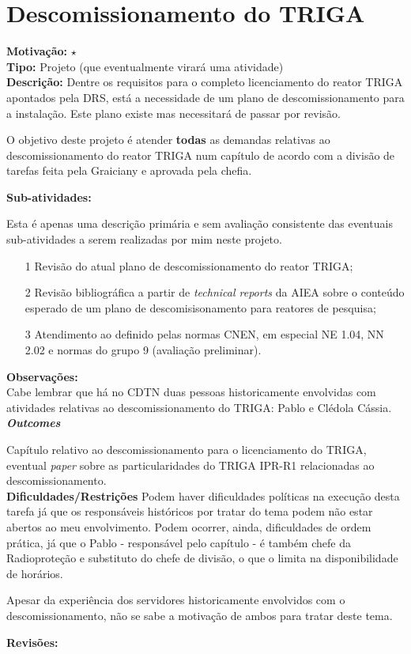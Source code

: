\chapter{Descomissionamento do TRIGA}

\textbf{Motivação:} $\star$\\

\textbf{Tipo:} Projeto (que eventualmente virará  uma atividade)\\

\textbf{Descrição:} Dentre os requisitos para o completo licenciamento do reator TRIGA apontados pela DRS, está a necessidade de um plano de descomissionamento para a instalação. Este plano existe mas necessitará de passar por revisão. 

O objetivo deste projeto é atender \textbf{todas} as demandas relativas ao descomissionamento do reator TRIGA num capítulo de acordo com a divisão de tarefas 
feita pela Graiciany e aprovada pela chefia.

\textbf{Sub-atividades:}

Esta é apenas uma descrição primária e sem avaliação consistente das eventuais 
sub-atividades a serem realizadas por mim neste projeto.

\begin{itemize}
	\item[1] Revisão do atual plano de descomissionamento do reator TRIGA;
	\item[2] Revisão bibliográfica a partir de \textit{technical reports} da AIEA 
	sobre o conteúdo esperado de um plano de descomisisonamento para reatores de pesquisa;
	\item[3] Atendimento ao definido pelas normas CNEN, em especial NE 1.04, NN 2.02 e normas do grupo 9 (avaliação preliminar).
\end{itemize}

\textbf{Observações:}\\

Cabe lembrar que há no CDTN duas pessoas historicamente envolvidas com atividades relativas ao descomissionamento do TRIGA: Pablo e Clédola Cássia.\\

\textbf{\textit{Outcomes}}

Capítulo relativo ao descomissionamento para o licenciamento do TRIGA, eventual 
\textit{paper} sobre as particularidades do TRIGA IPR-R1 relacionadas ao descomissionamento.\\

\textbf{Dificuldades/Restrições}
Podem haver dificuldades políticas na execução desta tarefa já que os responsáveis 
históricos por tratar do tema podem não estar abertos ao meu envolvimento. Podem ocorrer, ainda, dificuldades de ordem prática, já que o Pablo - responsável pelo capítulo - é também chefe da Radioproteção e substituto do chefe de divisão, o que 
o limita na disponibilidade de horários.

Apesar da experiência dos servidores historicamente envolvidos com o descomissionamento, não se sabe a motivação de ambos para tratar deste tema.


\textbf{Revisões:}
\date{\today}
